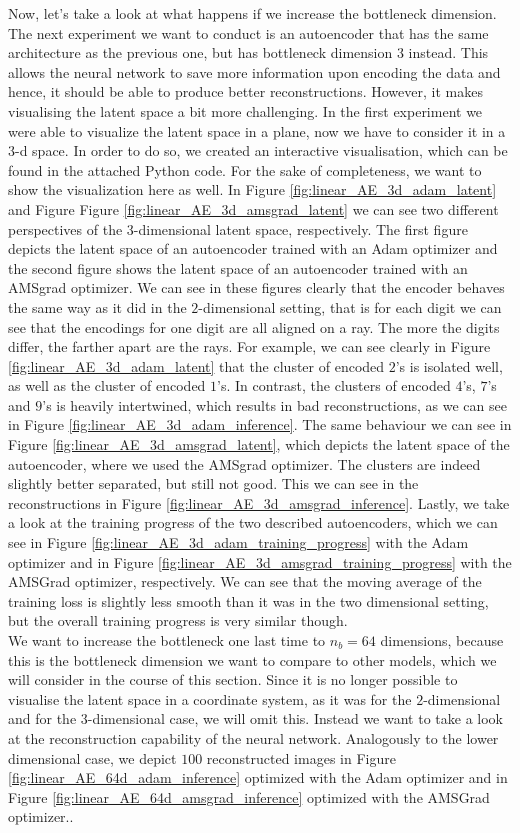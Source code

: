 Now, let's take a look at what happens if we increase the bottleneck dimension. The next experiment we want to conduct is an autoencoder that has the same architecture as the previous one, but has bottleneck dimension $3$ instead. This allows the neural network to save more information upon encoding the data and hence, it should be able to produce better reconstructions. However, it makes visualising the latent space a bit more challenging. In the first experiment we were able to visualize the latent space in a plane, now we have to consider it in a $3$-d space. In order to do so, we created an interactive visualisation, which can be found in the attached Python code. For the sake of completeness, we want to show the visualization here as well. In Figure \ref{fig:linear_AE_3d_adam_latent} and Figure Figure \ref{fig:linear_AE_3d_amsgrad_latent} we can see two different perspectives of the $3$-dimensional latent space, respectively. The first figure depicts the latent space of an autoencoder trained with an Adam optimizer and the second figure shows the latent space of an autoencoder trained with an AMSgrad optimizer. We can see in these figures clearly that the encoder behaves the same way as it did in the $2$-dimensional setting, that is for each digit we can see that the encodings for one digit are all aligned on a ray. The more the digits differ, the farther apart are the rays. For example, we can see clearly in Figure \ref{fig:linear_AE_3d_adam_latent} that the cluster of encoded $2$'s is isolated well, as well as the cluster of encoded $1$'s. In contrast, the clusters of encoded $4$'s, $7$'s and $9$'s is heavily intertwined, which results in bad reconstructions, as we can see in Figure \ref{fig:linear_AE_3d_adam_inference}. The same behaviour we can see in Figure \ref{fig:linear_AE_3d_amsgrad_latent}, which depicts the latent space of the autoencoder, where we used the AMSgrad optimizer. The clusters are indeed slightly better separated, but still not good. This we can see in the reconstructions in Figure \ref{fig:linear_AE_3d_amsgrad_inference}. Lastly, we take a look at the training progress of the two described autoencoders, which we can see in Figure \ref{fig:linear_AE_3d_adam_training_progress} with the Adam optimizer and in Figure \ref{fig:linear_AE_3d_amsgrad_training_progress} with the AMSGrad optimizer, respectively. We can see that the moving average of the training loss is slightly less smooth than it was in the two dimensional setting, but the overall training progress is very similar though.\\
We want to increase the bottleneck one last time to $n_b=64$ dimensions, because this is the bottleneck dimension we want to compare to other models, which we will consider in the course of this section. Since it is no longer possible to visualise the latent space in a coordinate system, as it was for the $2$-dimensional and for the $3$-dimensional case, we will omit this. Instead we want to take a look at the reconstruction capability of the neural network. Analogously to the lower dimensional case, we depict $100$ reconstructed images in Figure \ref{fig:linear_AE_64d_adam_inference} optimized with the Adam optimizer and in Figure \ref{fig:linear_AE_64d_amsgrad_inference} optimized with the AMSGrad optimizer..


